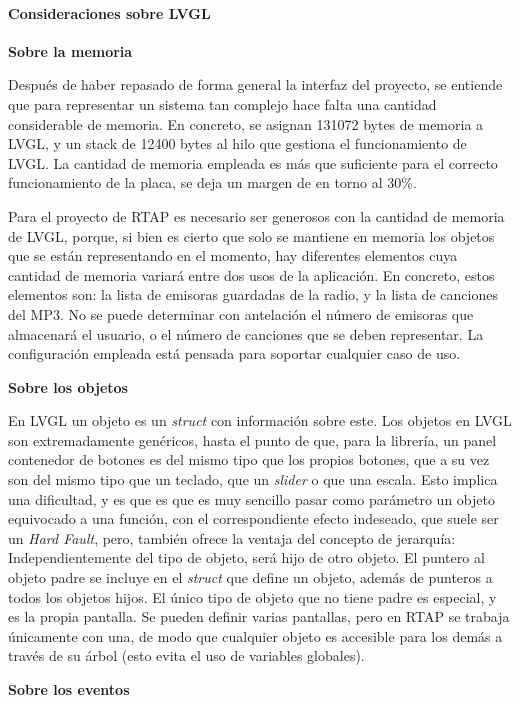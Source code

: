\paragraph{Consideraciones sobre LVGL}
\textbf{Sobre la memoria}

Después de haber repasado de forma general la interfaz del proyecto, se entiende que para representar un sistema tan complejo hace falta una cantidad considerable de memoria. En concreto, se asignan 131072 bytes de memoria a LVGL, y un stack de 12400 bytes al hilo que gestiona el funcionamiento de LVGL. La cantidad de memoria empleada es más que suficiente para el correcto funcionamiento de la placa, se deja un margen de en torno al 30\%. 

Para el proyecto de RTAP es necesario ser generosos con la cantidad de memoria de LVGL, porque, si bien es cierto que solo se mantiene en memoria los objetos que se están representando en el momento, hay diferentes elementos cuya cantidad de memoria variará entre dos usos de la aplicación. En concreto, estos elementos son: la lista de emisoras guardadas de la radio, y la lista de canciones del MP3. No se puede determinar con antelación el número de emisoras que almacenará el usuario, o el número de canciones que se deben representar. La configuración empleada está pensada para soportar cualquier caso de uso.

\textbf{Sobre los objetos}

En LVGL un objeto es un \textit{struct} con información sobre este. Los objetos en LVGL son extremadamente genéricos, hasta el punto de que, para la librería, un panel contenedor de botones es del mismo tipo que los propios botones, que a su vez son del mismo tipo que un teclado, que un \textit{slider} o que una escala. Esto implica una dificultad, y es que es que es muy sencillo pasar como parámetro un objeto equivocado a una función, con el correspondiente efecto indeseado, que suele ser un \textit{Hard Fault}, pero, también ofrece la ventaja del concepto de jerarquía: Independientemente del tipo de objeto, será hijo de otro objeto. El puntero al objeto padre se incluye en el \textit{struct} que define un objeto, además de punteros a todos los objetos hijos. El único tipo de objeto que no tiene padre es especial, y es la propia pantalla. Se pueden definir varias pantallas, pero en RTAP se trabaja únicamente con una, de modo que cualquier objeto es accesible para los demás a través de su árbol (esto evita el uso de variables globales).

\textbf{Sobre los eventos}

